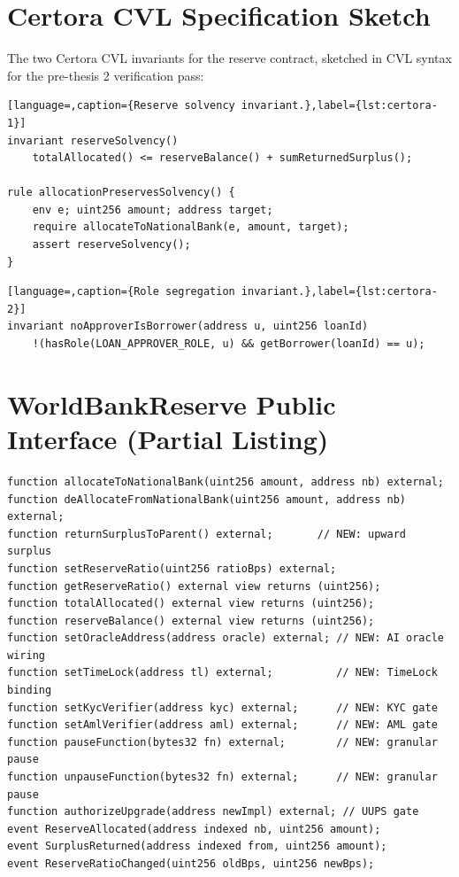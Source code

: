 \documentclass[12pt,a4paper]{report}
\begin{document}
\chapter{Certora CVL Specification Sketch}
\label{app:certora}

The two Certora CVL invariants for the reserve contract, sketched in CVL syntax for the pre-thesis 2 verification pass:

\begin{lstlisting}[language=,caption={Reserve solvency invariant.},label={lst:certora-1}]
invariant reserveSolvency()
    totalAllocated() <= reserveBalance() + sumReturnedSurplus();

rule allocationPreservesSolvency() {
    env e; uint256 amount; address target;
    require allocateToNationalBank(e, amount, target);
    assert reserveSolvency();
}
\end{lstlisting}

\begin{lstlisting}[language=,caption={Role segregation invariant.},label={lst:certora-2}]
invariant noApproverIsBorrower(address u, uint256 loanId)
    !(hasRole(LOAN_APPROVER_ROLE, u) && getBorrower(loanId) == u);
\end{lstlisting}

\chapter{WorldBankReserve Public Interface (Partial Listing)}
\label{app:wbr-listing}

\begin{lstlisting}[language=Solidity,caption={WorldBankReserve public interface (extended with v14 functions).}]
function allocateToNationalBank(uint256 amount, address nb) external;
function deAllocateFromNationalBank(uint256 amount, address nb) external;
function returnSurplusToParent() external;       // NEW: upward surplus
function setReserveRatio(uint256 ratioBps) external;
function getReserveRatio() external view returns (uint256);
function totalAllocated() external view returns (uint256);
function reserveBalance() external view returns (uint256);
function setOracleAddress(address oracle) external; // NEW: AI oracle wiring
function setTimeLock(address tl) external;          // NEW: TimeLock binding
function setKycVerifier(address kyc) external;      // NEW: KYC gate
function setAmlVerifier(address aml) external;      // NEW: AML gate
function pauseFunction(bytes32 fn) external;        // NEW: granular pause
function unpauseFunction(bytes32 fn) external;      // NEW: granular pause
function authorizeUpgrade(address newImpl) external; // UUPS gate
event ReserveAllocated(address indexed nb, uint256 amount);
event SurplusReturned(address indexed from, uint256 amount);
event ReserveRatioChanged(uint256 oldBps, uint256 newBps);
\end{lstlisting}
\end{document}
